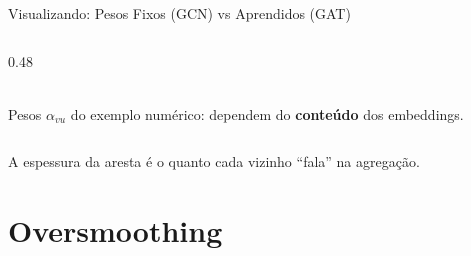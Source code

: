 \documentclass[aspectratio=169,xcolor=dvipsnames]{beamer}
\begin{document}
\begin{frame}{Visualizando: Pesos Fixos (GCN) vs Aprendidos (GAT)}
\begin{columns}[T]
\begin{column}{0.48\textwidth}
\\[0.5em]
        \small Pesos $\alpha_{vu}$ do exemplo numérico: dependem do
        \textbf{conteúdo} dos embeddings.
      \end{column}
    \end{columns}
    \vspace{0.4em}
    \centering
    A espessura da aresta é o quanto cada vizinho \enquote{fala} na agregação.
  \end{frame}

  \section{Oversmoothing}
\end{document}
